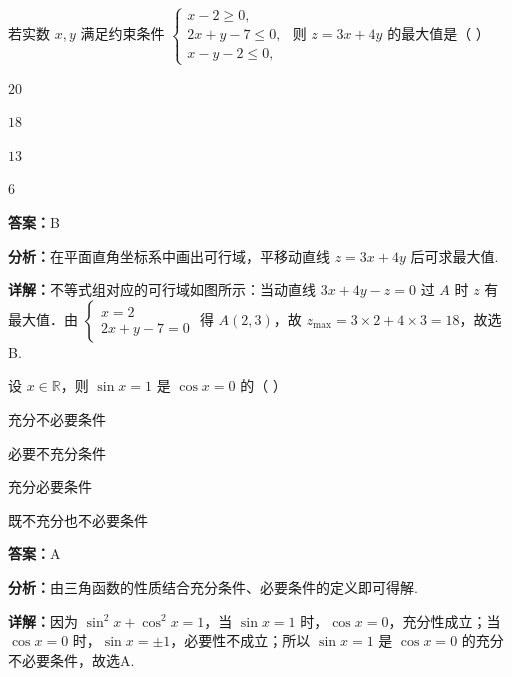 \begin{question}[points=4]
若实数 $x,y$ 满足约束条件 $\begin{cases} x-2 \ge 0, \\ 2x+y-7 \le 0, \\ x-y-2 \le 0, \end{cases}$ 则 $z = 3x+4y$ 的最大值是（ ）
\begin{choices}
  \item $20$
  \item $18$
  \item $13$
  \item $6$
\end{choices}
\begin{solution}
\textbf{答案：}B

\textbf{分析：}在平面直角坐标系中画出可行域，平移动直线 $z=3x+4y$ 后可求最大值.

\textbf{详解：}不等式组对应的可行域如图所示：当动直线 $3x+4y-z=0$ 过 $A$ 时 $z$ 有最大值．由 $\begin{cases} x=2 \\ 2x+y-7=0 \end{cases}$ 得 $A(2,3)$，故 $z_{\max}=3\times2+4\times3=18$，故选B.
\end{solution}
\end{question}

\begin{question}[points=4]
设 $x \in \mathbb{R}$，则 $\sin x = 1$ 是 $\cos x = 0$ 的（ ）
\begin{choices}
  \item 充分不必要条件
  \item 必要不充分条件
  \item 充分必要条件
  \item 既不充分也不必要条件
\end{choices}
\begin{solution}
\textbf{答案：}A

\textbf{分析：}由三角函数的性质结合充分条件、必要条件的定义即可得解.

\textbf{详解：}因为 $\sin^2 x + \cos^2 x = 1$，当 $\sin x = 1$ 时，$\cos x = 0$，充分性成立；当 $\cos x = 0$ 时，$\sin x = \pm 1$，必要性不成立；所以 $\sin x = 1$ 是 $\cos x = 0$ 的充分不必要条件，故选A.
\end{solution}
\end{question}

